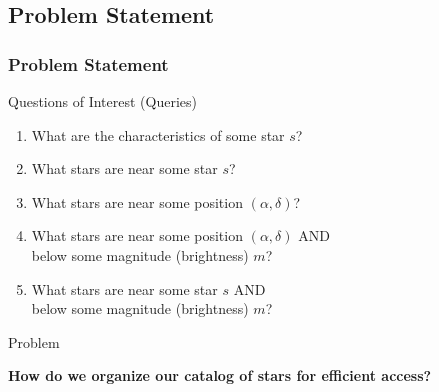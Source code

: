 \documentclass[11pt]{beamer}
\begin{document}
    \subsection{Problem Statement}\label{subsec:problemStatement}
    \begin{frame}
        \frametitle{Problem Statement}
        \begin{block}{Questions of Interest (Queries)}
            \begin{enumerate}
                \item What are the characteristics of some star $s$? \medskip
                \item What stars are near some star $s$? \medskip
                \item What stars are near some position $(\alpha, \delta)$? \medskip
                \item What stars are near some position $(\alpha, \delta)$ AND \\ below some magnitude (brightness)
                $m$? \medskip
                \item What stars are near some star $s$ AND \\ below some magnitude (brightness) $m$?
            \end{enumerate}
        \end{block} \medskip
        \begin{block}{Problem}
            \centerline{\textbf{How do we organize our catalog of stars for efficient access?}}
        \end{block}
    \end{frame}

\end{document}
